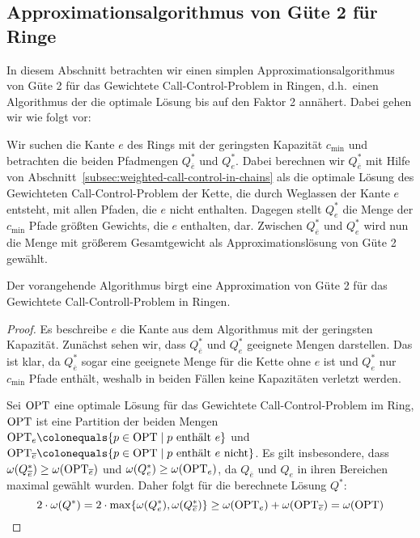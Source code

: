 \subsection{Approximationsalgorithmus von Güte 2 für Ringe}
In diesem Abschnitt betrachten wir einen simplen Approximationsalgorithmus von Güte 2 für das Gewichtete
Call-Control-Problem in Ringen, d.h.\ einen Algorithmus der die optimale Lösung bis auf den Faktor 2 annähert.
Dabei gehen wir wie folgt vor:

Wir suchen die Kante $e$ des Rings mit der geringsten Kapazität $c_{\min}$ und betrachten die beiden Pfadmengen
$Q_{\overline e}^*$ und $Q_{e}^*$.
Dabei berechnen wir $Q_{\overline e}^*$ mit Hilfe von Abschnitt~\ref{subsec:weighted-call-control-in-chains} als die
optimale Lösung des Gewichteten Call-Control-Problem der Kette, die durch
Weglassen der Kante $e$ entsteht, mit allen Pfaden, die $e$ nicht enthalten.
Dagegen stellt $Q_e^*$ die Menge der $c_{\min}$ Pfade größten Gewichts, die $e$ enthalten, dar.
Zwischen $Q_{\overline e}^*$ und $Q_{e}^*$ wird nun die Menge mit größerem Gesamtgewicht als
Approximationslösung von Güte 2 gewählt.

\begin{theorem}
    Der vorangehende Algorithmus birgt eine Approximation von Güte 2 für das Gewichtete Call-Controll-Problem in Ringen.
\end{theorem}
\begin{proof}
    Es beschreibe $e$ die Kante aus dem Algorithmus mit der geringsten Kapazität.
    Zunächst sehen wir, dass $Q_{\overline e}^*$ und $Q_e^*$ geeignete Mengen darstellen.
    Das ist klar, da $Q_{\overline e}^*$ sogar eine geeignete Menge für die Kette ohne $e$ ist und $Q_e^*$ nur $c_{\min}$
    Pfade enthält, weshalb in beiden Fällen keine Kapazitäten verletzt werden.

    Sei $\text{OPT}$ eine optimale Lösung für das Gewichtete Call-Control-Problem im Ring,
    $\text{OPT}$ ist eine Partition der beiden Mengen $\OPT_e \colonequals \{p \in \OPT \mid p\ \text{enthält}\ e\}$ und
    $\OPT_{\overline e} \colonequals \{p\in\OPT\mid p\ \text{enthält}\ e\ \text{nicht}\}$.
    Es gilt insbesondere, dass $\omega(Q_{\overline e}^*) \geq \omega(\text{OPT}_{\overline e})$ und
    $\omega(Q_e^*) \geq \omega(\text{OPT}_{e})$, da $Q_{\overline e}$ und $Q_e$ in ihren Bereichen maximal gewählt wurden.
    Daher folgt für die berechnete Lösung $Q^*$:
    \[2 \cdot \omega(Q^*) = 2 \cdot  \max\{\omega(Q_e^*), \omega(Q_{\overline e}^*)\} \geq
    \omega(\text{OPT}_e) + \omega(\text{OPT}_{\overline e}) = \omega(\text{OPT}) \]
\end{proof}
